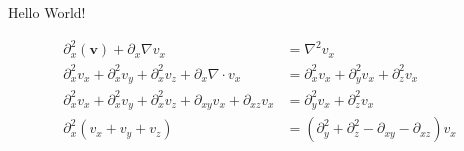 Hello World!
\usepackage{amsmath}
\begin{align*}
    \partial_x^2(\mathbf v)+\partial _x\nabla v_x&=\nabla ^2v_x\\
\partial ^2_xv_x+\partial ^2_xv_y+\partial^2_xv_z+\partial _x\nabla \cdot v_x&=\partial_x^2v_x+\partial_y^2v_x+\partial_z ^2v_x\\
\partial ^2_xv_x+\partial ^2_xv_y+\partial^2_xv_z+\partial _{xy}v_x+\partial_{xz}v_x&=\partial_y^2v_x+\partial_z ^2v_x\\
\partial^2_x(v_x+v_y+v_z)&=(\partial _y^2+\partial_z^2-\partial _{xy}-\partial_{xz})v_x
\end{align*}